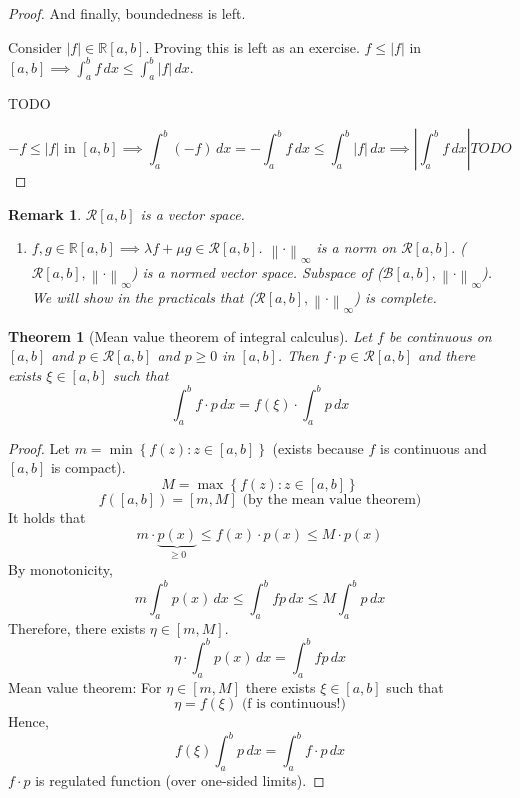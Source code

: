 \documentclass{article}
\newtheorem{theorem}{Theorem}  \numberwithin{theorem}{section}
\newtheorem{remark}{Remark}  \numberwithin{remark}{section}
\newcommand{\set}[1]{\left\{#1\right\}}
\newcommand{\norm}[1]{\left\|#1\right\|}
\newcommand{\card}[1]{\left|#1\right|}
\begin{document}
\begin{proof}
  And finally, boundedness is left.

  Consider $\card{f} \in \mathbb R[a,b]$. Proving this is left as an exercise.
  $f \leq \card{f}$ in $[a,b] \implies \int_a^b f \, dx \leq \int_a^b \card{f} \, dx$.

  TODO

  \[ -f \leq \card{f} \text{ in } [a,b] \implies \int_a^b (-f) \, dx = -\int_a^b f \, dx \leq \int_a^b \card{f} \, dx
    \implies \card{\int_a^b f \, dx} TODO
  \]
\end{proof}

\begin{remark}
  $\mathcal R[a,b]$ is a vector space.

  \begin{enumerate}
    \item $f, g \in \mathbb R[a,b] \implies \lambda f + \mu g \in \mathcal R[a,b]$.
      $\norm{\cdot}_{\infty}$ is a norm on $\mathcal R[a,b]$.
      ($\mathcal R[a,b], \norm{\cdot}_{\infty}$) is a normed vector space.
      Subspace of ($\mathcal B[a,b], \norm{\cdot}_{\infty}$).
      We will show in the practicals that ($\mathcal R[a,b], \norm{\cdot}_{\infty}$) is complete.
  \end{enumerate}
\end{remark}

\begin{theorem}[Mean value theorem of integral calculus]
  \label{mvt} \label{satz3}
  Let $f$ be continuous on $[a,b]$ and $p \in \mathcal R[a,b]$
  and $p \geq 0$ in $[a,b]$.
  Then $f \cdot p \in \mathcal R[a,b]$ and there exists $\xi \in [a,b]$ such that
  \[ \int_a^b f \cdot p \, dx = f(\xi) \cdot \int_a^b p \, dx \]
\end{theorem}
\begin{proof}
  Let $m = \min\set{f(z): z \in [a,b]}$ (exists because $f$ is continuous and $[a,b]$ is compact).
  \[ M = \max\set{f(z): z \in [a,b]} \]
  \[ f([a,b]) = [m, M] \text{ (by the mean value theorem)} \]
  It holds that
  \[ m \cdot \underbrace{p(x)}_{\geq 0} \leq f(x) \cdot p(x) \leq M \cdot p(x) \]
  By monotonicity,
  \[ m \int_a^b p(x) \, dx \leq \int_a^b fp \, dx \leq M \int_a^b p \, dx \]
  Therefore, there exists $\eta \in [m, M]$.
  \[ \eta \cdot \int_a^b p(x) \, dx = \int_a^b fp \, dx \]
  Mean value theorem: For $\eta \in [m,M]$ there exists $\xi \in [a,b]$ such that
  \[ \eta = f(\xi) \text{ (f is continuous!)} \]
  Hence,
  \[ f(\xi) \int_a^b p \, dx = \int_a^b f \cdot p \, dx \]
  $f \cdot p$ is regulated function (over one-sided limits).
\end{proof}
\end{document}
